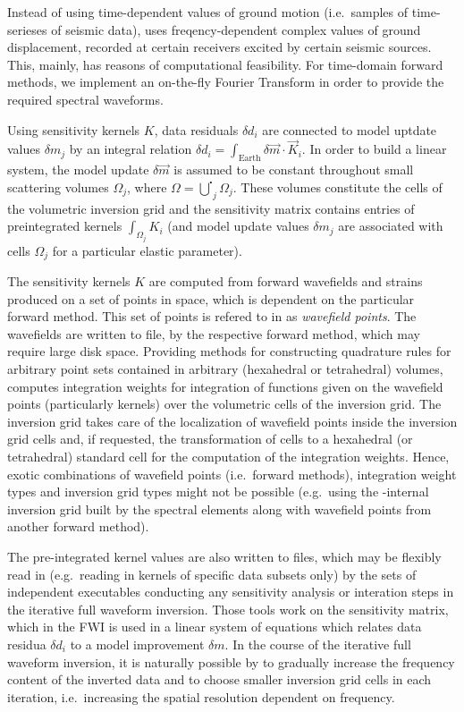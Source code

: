 Instead of using time-dependent values of ground motion (i.e.\ samples of time-serieses of seismic data), 
\ASKI{} uses freqency-dependent complex values of ground displacement, recorded at certain receivers excited 
by certain seismic sources. This, mainly, has reasons of computational feasibility.
For time-domain forward methods, we implement an on-the-fly Fourier Transform in order to provide the
required spectral waveforms. 

Using sensitivity kernels $K$, data residuals $\delta d_i$ are connected to model uptdate values $\delta m_j$ by 
an integral relation $\delta d_i = \int_{\text{Earth}} \delta \vec{m} \cdot \vec{K}_i$. In order to build a linear 
system, the model update $\delta \vec{m}$ is assumed to be constant throughout small scattering volumes 
$\Omega_j$, where $\Omega = \overset{\centerdot}{\bigcup}_j \Omega_j$. These volumes constitute the cells of the volumetric 
inversion grid and the sensitivity matrix contains entries of preintegrated kernels $\int_{\Omega_j} K_i$ (and
model update values $\delta m_j$ are associated with cells $\Omega_j$ for a particular elastic parameter).

The sensitivity kernels $K$ are computed from forward wavefields and strains produced on a set of points in 
space, which
is dependent on the particular forward method. This set of points is refered to in \ASKI{} as 
\emph{wavefield points}. The 
wavefields are written to file, by the respective forward method, which may require large disk space. 
Providing methods for constructing quadrature rules for arbitrary point sets contained in 
arbitrary (hexahedral or tetrahedral) volumes, 
\ASKI{} computes integration weights for integration of functions given on the wavefield points 
(particularly kernels) over the volumetric
cells of the inversion grid. The inversion grid takes care of the localization of wavefield points 
inside the inversion grid cells and, if requested, the transformation of cells to a hexahedral (or tetrahedral) 
standard 
cell for the computation of the integration weights. Hence, exotic combinations of wavefield points (i.e.\ 
forward methods), integration weight types and inversion grid types might not be possible (e.g.\ using the
\lcode{SPECFEM}-internal inversion grid built by the spectral elements along with wavefield points from 
another forward method). 

The pre-integrated kernel values are also written to files, which may be flexibly read in 
(e.g.\ reading in kernels of specific data subsets only)
by the sets of independent \ASKI{} executables conducting any sensitivity analysis 
or interation steps in the iterative full waveform inversion.
Those tools work on the sensitivity matrix, which in the FWI is used in a linear system of equations which
relates data residua $\delta d_i$ to a model improvement $\delta m$. 
In the course of the iterative full waveform inversion, it is naturally possible by \ASKI{} to gradually increase
the frequency content of the inverted data and to choose smaller inversion grid cells in each iteration, 
i.e.\ increasing the spatial resolution dependent on frequency.
